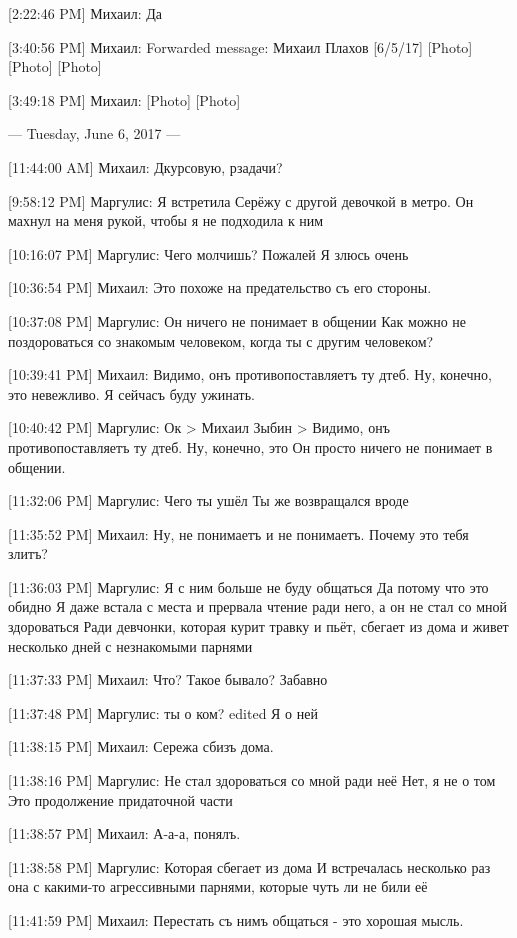 \documentclass{article}
\newcommand{\yat}{{\fontencoding{X2}\selectfont\cyryat}} %
\begin{document}
[2:22:46 PM] Михаил:
Да

[3:40:56 PM] Михаил:
Forwarded message: Михаил Плахов [6/5/17] 
[Photo]
[Photo]
[Photo]

[3:49:18 PM] Михаил:
[Photo]
 [Photo]

--- Tuesday, June 6, 2017 ---

[11:44:00 AM] Михаил:
Д курсовую, р задачи?

[9:58:12 PM] Маргулис:
Я встретила Серёжу с другой девочкой в метро. Он махнул на меня рукой, чтобы я не подходила к ним

[10:16:07 PM] Маргулис:
Чего молчишь?
 Пожалей
 Я злюсь очень

[10:36:54 PM] Михаил:
Это похоже на предательство съ его стороны.

[10:37:08 PM] Маргулис:
Он ничего не понимает в общении
 Как можно не поздороваться со знакомым человеком, когда ты с другим человеком?

[10:39:41 PM] Михаил:
Видимо, онъ противопоставляетъ ту д теб\yat. Ну, конечно, это невежливо.
 Я сейчасъ буду ужинать.

[10:40:42 PM] Маргулис:
Ок
> Михаил Зыбин
> Видимо, онъ противопоставляетъ ту д теб\yat. Ну, конечно, это
Он просто ничего не понимает в общении.

[11:32:06 PM] Маргулис:
Чего ты ушёл
 Ты же возвращался вроде

[11:35:52 PM] Михаил:
Ну, не понимаетъ и не понимаетъ. Почему это тебя злитъ?

[11:36:03 PM] Маргулис:
Я с ним больше не буду общаться
 Да потому что это обидно
 Я даже встала с места и прервала чтение ради него, а он не стал со мной здороваться
 Ради девчонки, которая курит травку и пьёт, сбегает из дома и живет несколько дней с незнакомыми парнями

[11:37:33 PM] Михаил:
Что? Такое бывало?
 Забавно

[11:37:48 PM] Маргулис:
ты о ком?
edited 
Я о ней

[11:38:15 PM] Михаил:
Сережа сб изъ дома.

[11:38:16 PM] Маргулис:
Не стал здороваться со мной ради неё
 Нет, я не о том
 Это продолжение придаточной части

[11:38:57 PM] Михаил:
А-а-а, понялъ.

[11:38:58 PM] Маргулис:
Которая сбегает из дома
 И встречалась несколько раз она с какими-то агрессивными парнями, которые чуть ли не били её

[11:41:59 PM] Михаил:
Перестать съ нимъ общаться - это хорошая мысль.
\end{document}
